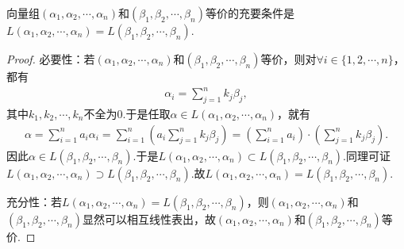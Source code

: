 \documentclass[../../main.tex]{subfiles}
\begin{document}
\begin{proposition}\label{proposition:等价向量组张成的子空间相同}
向量组$(\alpha_1,\alpha_2,\cdots,\alpha_n)$和$(\beta_1,\beta_2,\cdots,\beta_n)$等价的充要条件是$L(\alpha_1,\alpha_2,\cdots,\alpha_n) = L(\beta_1,\beta_2,\cdots,\beta_n)$.
\end{proposition}
\begin{proof}
必要性：若$(\alpha _1,\alpha _2,\cdots ,\alpha _n)$和$(\beta _1,\beta _2,\cdots ,\beta _n)$等价，则对$\forall i\in \{ 1,2,\cdots ,n \}$，都有
\begin{align*}
\alpha _i=\sum_{j=1}^n{k_j\beta _j},
\end{align*}
其中$k_1,k_2,\cdots ,k_n$不全为$0$.于是任取$\alpha \in L(\alpha _1,\alpha _2,\cdots ,\alpha _n)$，就有
\begin{align*}
\alpha =\sum_{i=1}^n{a_i\alpha _i}=\sum_{i=1}^n{\left( a_i\sum_{j=1}^n{k_j\beta _j} \right)}=\left( \sum_{i=1}^n{a_i} \right) \cdot \left( \sum_{j=1}^n{k_j\beta _j} \right) .
\end{align*}
因此$\alpha \in L(\beta _1,\beta _2,\cdots ,\beta _n)$.于是$L(\alpha _1,\alpha _2,\cdots ,\alpha _n) \subset L(\beta _1,\beta _2,\cdots ,\beta _n)$.同理可证$L(\alpha _1,\alpha _2,\cdots ,\alpha _n) \supset L(\beta _1,\beta _2,\cdots ,\beta _n)$.故$L(\alpha _1,\alpha _2,\cdots ,\alpha _n) =L(\beta _1,\beta _2,\cdots ,\beta _n)$.

充分性：若$L(\alpha _1,\alpha _2,\cdots ,\alpha _n) =L(\beta _1,\beta _2,\cdots ,\beta _n)$，则$(\alpha _1,\alpha _2,\cdots ,\alpha _n)$和$(\beta _1,\beta _2,\cdots ,\beta _n)$显然可以相互线性表出，故$(\alpha _1,\alpha _2,\cdots ,\alpha _n)$和$(\beta _1,\beta _2,\cdots ,\beta _n)$等价.
\end{proof}
\end{document}

